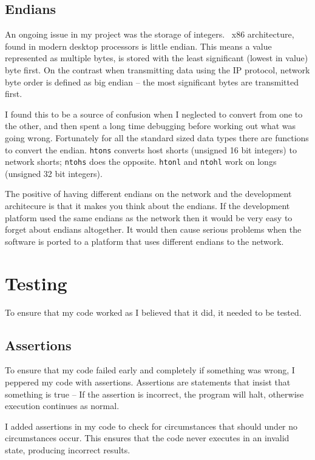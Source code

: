 \documentclass[12pt]{report}
\begin{document}
\section{Endians}
An ongoing issue in my project was the storage of integers.
\ x86 architecture, found in modern desktop processors is little endian.
This means a value represented as multiple bytes, is stored with the least
significant (lowest in value) byte first. On the contrast
when transmitting data using the IP protocol, network byte order
is defined as big endian -- the most significant bytes are transmitted
first. 

I found this to be a source of confusion when I neglected to convert from one
to the other, and then spent a long time debugging before working out what was
going wrong. Fortunately for all the standard sized data types there are
functions to convert the endian. \texttt{htons} converts host shorts (unsigned
16 bit integers) to network shorts; \texttt{ntohs} does the opposite.
\texttt{htonl} and \texttt{ntohl} work on longs (unsigned 32 bit integers). 

The positive of having different endians on the network and the development
architecure is that it makes you think about the endians. If the development
platform used the same endians as the network then it would be very easy to
forget about endians altogether. It would then cause serious problems when
the software is ported to a platform that uses different endians to the
network.
    
\chapter{Testing}
To ensure that my code worked as I believed that it did, it needed to be
tested. 

\section{Assertions}
To ensure that my code failed early and completely if something was wrong, I
peppered my code with assertions. Assertions are statements that insist that
something is true -- If the assertion is incorrect, the program will halt,
otherwise execution continues as normal.

I added assertions in my code to check for circumstances that should under no
circumstances occur. This ensures that the code never executes in an invalid
state, producing incorrect results. 
\end{document}
